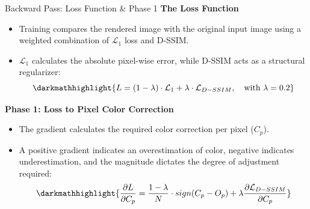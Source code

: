 \begin{frame}{Backward Pass: Loss Function \& Phase 1}
    \textbf{The Loss Function}
    \begin{itemize}
        \justifying
        \item Training compares the rendered image with the original input image using a weighted combination of $\mathcal{L}_1$ loss and D-SSIM.
        \item $\mathcal{L}_1$ calculates the absolute pixel-wise error, while D-SSIM acts as a structural regularizer:
        $$\darkmathhighlight{ L = (1-\lambda)\cdot\mathcal{L}_1 + \lambda\cdot\mathcal{L}_{D-SSIM}, \quad \text{with } \lambda=0.2 }$$
    \end{itemize}

    \pause
    \vspace{1em}

    \textbf{Phase 1: Loss to Pixel Color Correction}
    \begin{itemize}
        \justifying
        \item The gradient calculates the required color correction per pixel ($C_p$).
        \item A positive gradient indicates an overestimation of color, negative indicates underestimation, and the magnitude dictates the degree of adjustment required:
        $$\darkmathhighlight{ \frac{\partial L}{\partial C_p} = \frac{1-\lambda}{N} \cdot sign(C_p - O_p) + \lambda \frac{\partial \mathcal{L}_{D-SSIM}}{\partial C_p} }$$
    \end{itemize}
\end{frame}

